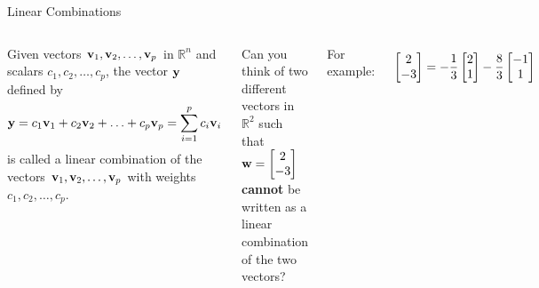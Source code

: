 \documentclass[xcolor=dvipsnames,aspectratio=169,t]{beamer}
\begin{document}
\begin{frame}{Linear Combinations}

  \begin{columns}[T]

    \column{0.5\tw}
    
  {\small  
  \bbox
  Given vectors $\mathbf{v}_1, \mathbf{v}_2, \ldots , \mathbf{v}_p $ in $\mathbb{R}^n$ and scalars $c_1, c_2, \ldots , c_p$, the vector $\mathbf{y}$ defined by
  \[ \mathbf{y} = c_1 \mathbf{v}_1 + c_2 \mathbf{v}_2 + \ldots + c_p \mathbf{v}_p = \sum_{i=1}^p c_i \mathbf{v}_i \]
  is called a \alert{linear combination} of the vectors $\mathbf{v}_1, \mathbf{v}_2, \ldots , \mathbf{v}_p $ with weights $c_1, c_2, \ldots , c_p$.
  \ebox

\alert{Can you think of two different vectors in $\mathbb{R}^2$ such that $\displaystyle \mathbf{w} = \begin{bmatrix} 2 \\ -3 \end{bmatrix}$ \textbf{cannot} be written as a linear combination of the two vectors?} }
  
  \column{0.5\tw}

  {\small 
  For example: 

  \[ \begin{bmatrix} 2 \\ -3 \end{bmatrix} = -\frac{1}{3} \begin{bmatrix} 2 \\ 1 \end{bmatrix} - \frac{8}{3} \begin{bmatrix} -1 \\ 1 \end{bmatrix} \] }

  \includegraphics[width=0.9\tw]{images/fig-span2.png}

  
\end{columns}
  
\end{frame}
\end{document}
